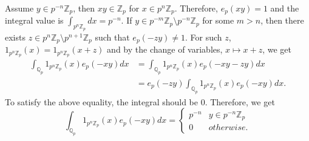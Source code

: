 \documentclass[a4paper, 12pt]{article}
\theoremstyle{Mydefinition}
\theoremstyle{Mytheorem}
\begin{document}
Assume $y\in p^{-n}\mathbb{Z}_p$, then $xy \in \mathbb{Z}_p$ for $x\in p^n\mathbb{Z}_p$. Therefore, $e_p(xy) = 1$ and the integral value is $\int_{p^n \mathbb{Z}_p} dx = p^{-n}$. If $y\in p^{-m}\mathbb{Z}_p\setminus p^{-n}\mathbb{Z}_p$ for some $m>n$, then there exists $z\in p^{n}\mathbb{Z}_p\setminus p^{n+1}\mathbb{Z}_p$ such that $e_p(-zy)\neq 1$. For such $z$, $1_{p^n\mathbb{Z}_p}(x) = 1_{p^n\mathbb{Z}_p}(x+z)$ and by the change of variables, $x\mapsto x+z$, we get
\begin{equation}
\begin{split}
    \int_{\mathbb{Q}_p} 1_{p^n\mathbb{Z}_p}(x)e_p(-xy)dx &= \int_{\mathbb{Q}_p} 1_{p^n\mathbb{Z}_p}(x)e_p(-xy-zy)dx \\
    &=e_p(-zy)\int_{\mathbb{Q}_p} 1_{p^n\mathbb{Z}_p}(x)e_p(-xy)dx.
\end{split}
\end{equation}
To satisfy the above equality, the integral should be $0$. Therefore, we get
\begin{equation}
    \int_{\mathbb{Q}_p} 1_{p^n\mathbb{Z}_p}(x)e_p(-xy)dx=
    \begin{cases}
        p^{-n} & y\in p^{-n}\mathbb{Z}_p\\
        0 & otherwise.
    \end{cases}
\end{equation}
\end{document}
